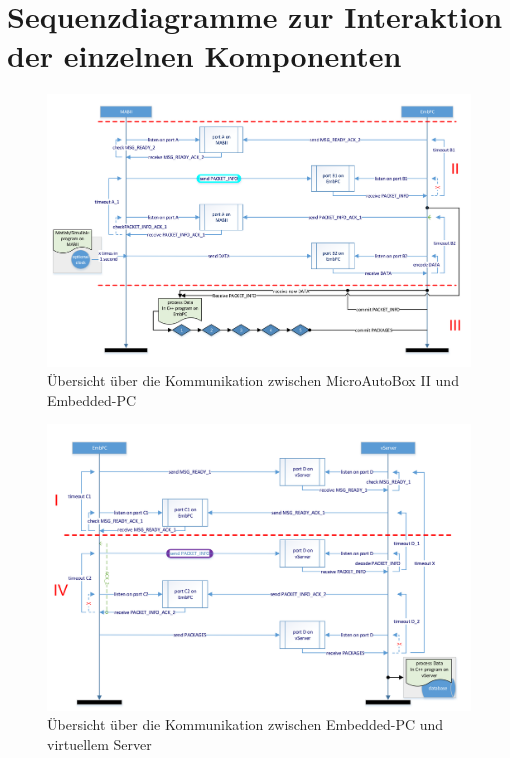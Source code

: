 \documentclass[fontsize = 12pt, paper = a4]{scrreprt}
\begin{document}
\newpage

\section{Sequenzdiagramme zur Interaktion der einzelnen Komponenten}

\begin{figure}
\centering
\includegraphics[scale = 0.95]{Kommunikationsaufbau_1}
\caption[Übersicht über die Kommunikation zwischen MicroAutoBox II und Embedded-PC]{Übersicht über die Kommunikation zwischen MicroAutoBox II und Embedded-PC}
\label{Kommunikationsaufbau1}
\end{figure}

\newpage

\begin{figure}
\centering
\includegraphics[scale = 0.95]{Kommunikationsaufbau_2}
\caption[Übersicht über die Kommunikation zwischen Embedded-PC und virtuellem Server]{Übersicht über die Kommunikation zwischen Embedded-PC und virtuellem Server}
\label{Kommunikationsaufbau2}
\end{figure}
\end{document}
